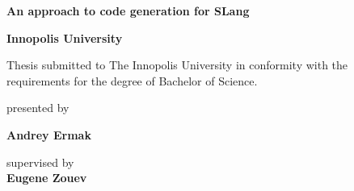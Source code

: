 \begin{titlepage}

\begin{center}

\textbf{\Large{An approach to code generation for SLang}}
\vspace{4cm}

\textbf{\Large Innopolis University} \\

\vspace{0.60cm}

{\Large Thesis submitted to The Innopolis University in conformity with the
requirements for the degree of Bachelor of Science.}

\vspace{6cm}

{\Large presented by}

\vspace{0.40cm}

\textbf{\Large Andrey Ermak}
\vspace{0.40cm}

{\Large supervised by}\\
\vspace{0.40cm}
{\bf\Large Eugene Zouev}\\
\vspace{0.60cm}



\end{center}
\end{titlepage}

